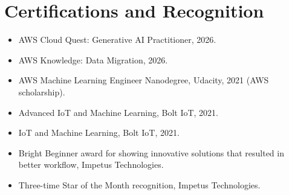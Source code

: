\section{Certifications and Recognition}
\begin{itemize}
  \item AWS Cloud Quest: Generative AI Practitioner, 2026.
  \item AWS Knowledge: Data Migration, 2026.
  \item AWS Machine Learning Engineer Nanodegree, Udacity, 2021 (AWS
  scholarship).
  \item Advanced IoT and Machine Learning, Bolt IoT, 2021.
  \item IoT and Machine Learning, Bolt IoT, 2021.
  \item Bright Beginner award for showing innovative solutions that resulted in better workflow, Impetus Technologies.
  \item Three-time Star of the Month recognition, Impetus Technologies.
\end{itemize}
